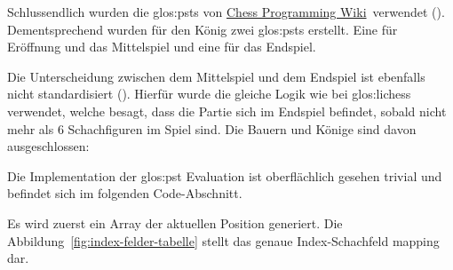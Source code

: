 Schlussendlich wurden die \glspl{glos:pst} von \href{https://www.chessprogramming.org/Simplified_Evaluation_Function}{Chess Programming Wiki}~verwendet (\cite{piecesquaretablesef}).
Dementsprechend wurden für den König zwei \glspl{glos:pst} erstellt.
Eine für Eröffnung und das Mittelspiel und eine für das Endspiel.

\newpage

Die Unterscheidung zwischen dem Mittelspiel und dem Endspiel ist ebenfalls nicht standardisiert (\cite{chessendgame}).
Hierfür wurde die gleiche Logik wie bei \gls{glos:lichess} verwendet, welche besagt, dass die Partie sich im Endspiel befindet, sobald nicht mehr als 6 Schachfiguren im Spiel sind.
Die Bauern und Könige sind davon ausgeschlossen:



Die Implementation der \gls{glos:pst} Evaluation ist oberflächlich gesehen trivial und befindet sich im folgenden Code-Abschnitt.


\newpage

Es wird zuerst ein Array der aktuellen Position generiert.
Die Abbildung~\ref{fig:index-felder-tabelle} stellt das genaue Index-Schachfeld mapping dar.

